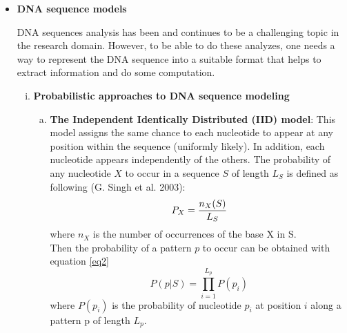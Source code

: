 \documentclass[10pt,twocolumn,letterpaper]{article}
\begin{document}
{\begin{itemize}
   \item \textbf{DNA sequence models}
   \par{
       DNA sequences analysis has been and continues to be a challenging topic in the research domain. However, to be able to do these analyzes, one needs a way to represent the DNA sequence into a suitable format 
       that helps to extract information and do some computation.
       \begin{enumerate}[i.]
           \item \textbf{Probabilistic approaches to DNA sequence modeling}
           \begin{enumerate}[a.]
               \item \textbf{The Independent Identically Distributed (IID) model}: This model assigns the same chance to each nucleotide to appear at any position within the sequence (uniformly likely).
               In addition, each nucleotide appears independently of the others. The probability of any nucleotide \(X\) to occur in a sequence \(S\) of length \(L_S\) is defined as following (G. Singh et al. 2003):
               \begin{equation}
                   P_X = \frac{n_{X}(S)}{L_S}\\
               \end{equation}
               where \(n_X\) is the number of occurrences of the base X in S.\\
               Then the probability of a pattern \(p\) to occur can be obtained with equation \ref{eq2}
               \begin{equation}
                    P(p | S) = \prod_{i=1}^{L_p} P(p_i)
                   \label{eq2}
               \end{equation}
               where \(P(p_i)\) is the probability of nucleotide \(p_i\) at position \(i\) along a pattern p of length \(L_p\).\\
               

\end{enumerate}
\end{enumerate}}
\end{itemize}}
\end{document}
